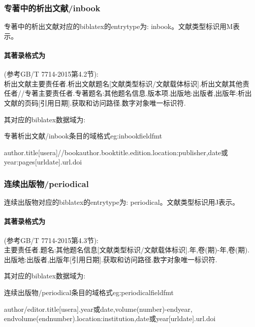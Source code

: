 \subsubsection{专著中的析出文献/inbook}
\begin{refentry}{}{}
专著中的析出文献对应的biblatex的entrytype为: inbook。文献类型标识用M表示。

\paragraph{其著录格式为}(参考GB/T 7714-2015第4.2节):\\
析出文献主要责任者.析出文献题名[文献类型标识/文献载体标识].析出文献其他责任者//专著主要责任者.专著题名:其他题名信息.版本项.出版地:出版者,出版年:析出文献的页码[引用日期].获取和访问路径.数字对象唯一标识符.
\end{refentry}

其对应的biblatex数据域为:
\begin{example}{专著析出文献/inbook条目的域格式}{eg:inbookfieldfmt}
\begin{texlist}
author.title[usera]//bookauthor.booktitle.edition.location:publisher,date或year:pages[urldate].url.doi
\end{texlist}
\end{example}

\subsubsection{连续出版物/periodical}
\begin{refentry}{}{}
连续出版物对应的biblatex的entrytype为: periodical。文献类型标识用J表示。

\paragraph{其著录格式为}(参考GB/T 7714-2015第4.3节):\\
主要责任者.题名:其他题名信息[文献类型标识/文献载体标识].年,卷(期)-年,卷(期).出版地:出版者,出版年[引用日期].获取和访问路径.数字对象唯一标识符.
\end{refentry}

其对应的biblatex数据域为:
\begin{example}{连续出版物/periodical条目的域格式}{eg:periodicalfieldfmt}
\begin{texlist}
author/editor.title[usera].year或date,volume(number)-endyear, endvolume(endnumber).location:institution,date或year[urldate].url.doi
\end{texlist}
\end{example}

